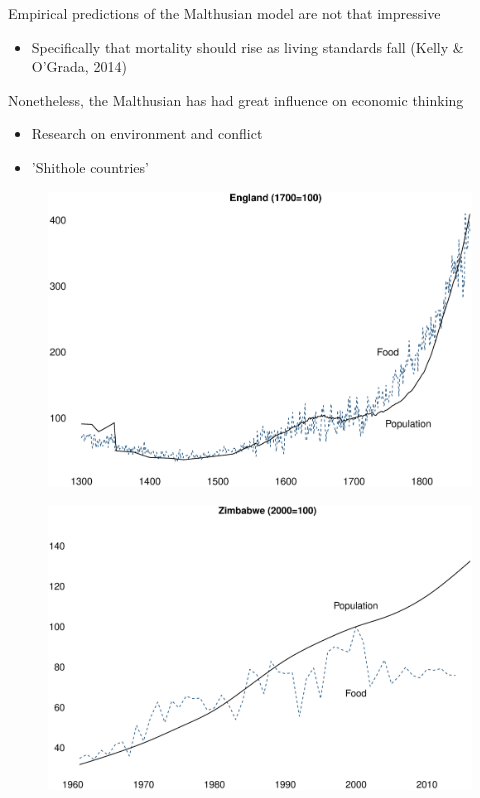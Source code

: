 \documentclass{beamer}
\begin{document}
\begin{frame}
  Empirical predictions of the Malthusian model are not that impressive
  \begin{itemize}
    \item Specifically that mortality should rise as living standards fall (Kelly \& O'Grada, 2014)
  \end{itemize}
  \medskip
  Nonetheless, the Malthusian has had great influence on economic thinking
  \begin{itemize}
    \item Research on environment and conflict
    \item 'Shithole countries' 
  \end{itemize}
\end{frame}

\begin{frame}
  \begin{figure}
    \includegraphics[scale=.3]{malthus.eps}
  \end{figure}  
\end{frame}

\begin{frame}
  \begin{figure}
    \includegraphics[scale=.3]{malthus2.eps}
  \end{figure}  
\end{frame}
\end{document}
